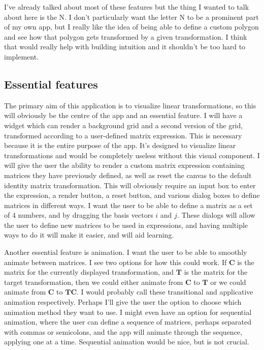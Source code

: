 \documentclass[../main.tex]{subfiles}
\begin{document}
I've already talked about most of these features but the thing I wanted to talk about here is the N. I don't particularly want the letter N to be a prominent part of my own app, but I really like the idea of being able to define a custom polygon and see how that polygon gets transformed by a given transformation. I think that would really help with building intuition and it shouldn't be too hard to implement.

\subsection{Essential features\label{analysis:essential-features}}

The primary aim of this application is to visualize linear transformations, so this will obviously be the centre of the app and an essential feature. I will have a widget which can render a background grid and a second version of the grid, transformed according to a user-defined matrix expression. This is necessary because it is the entire purpose of the app. It's designed to visualize linear transformations and would be completely useless without this visual component. I will give the user the ability to render a custom matrix expression containing matrices they have previously defined, as well as reset the canvas to the default identity matrix transformation. This will obviously require an input box to enter the expression, a render button, a reset button, and various dialog boxes to define matrices in different ways. I want the user to be able to define a matrix as a set of 4 numbers, and by dragging the basis vectors $i$ and $j$. These dialogs will allow the user to define new matrices to be used in expressions, and having multiple ways to do it will make it easier, and will aid learning.

Another essential feature is animation. I want the user to be able to smoothly animate between matrices. I see two options for how this could work. If $\mathbf{C}$ is the matrix for the currently displayed transformation, and $\mathbf{T}$ is the matrix for the target transformation, then we could either animate from $\mathbf{C}$ to $\mathbf{T}$ or we could animate from $\mathbf{C}$ to $\mathbf{TC}$. I would probably call these transitional and applicative animation respectively. Perhaps I'll give the user the option to choose which animation method they want to use. I might even have an option for sequential animation, where the user can define a sequence of matrices, perhaps separated with commas or semicolons, and the app will animate through the sequence, applying one at a time. Sequential animation would be nice, but is not crucial.
\end{document}
